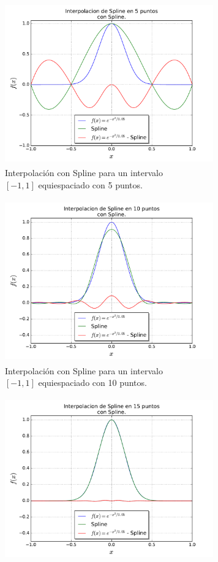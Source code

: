 \documentclass[a4paper, 11pt, spanish]{article}
\begin{document}
\begin{figure}[!hbpt]
\centering
\begin{subfigure}{.5\textwidth}
  \centering
  \includegraphics[width=9cm, height=7cm]{img/spline5.pdf}
  \caption{Interpolaci\'on con Spline para un intervalo\\ $[-1,1]$ equiespaciado con 5 puntos.}
\end{subfigure}%
\begin{subfigure}{.5\textwidth}
  \centering
  \includegraphics[width=9cm, height=7cm]{img/spline10.pdf}
  \caption{Interpolaci\'on con Spline para un intervalo\\ $[-1,1]$ equiespaciado con 10 puntos.}
\end{subfigure}
\begin{subfigure}{.5\textwidth}
  \centering
  \includegraphics[width=9cm, height=7cm]{img/spline15.pdf}

\end{subfigure}
\end{figure}
\end{document}
